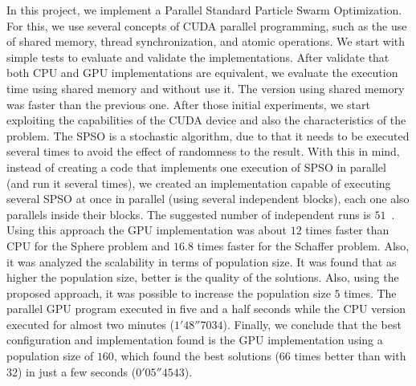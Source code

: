 \documentclass[conference]{IEEEtran}
\begin{document}
    In this project, we implement a Parallel Standard Particle Swarm Optimization.
    For this, we use several concepts of CUDA parallel programming, such as the use of shared memory, thread synchronization, and atomic operations.
    We start with simple tests to evaluate and validate the implementations.
    After validate that both CPU and GPU implementations are equivalent, we evaluate the execution time using shared memory and without use it. The version using shared memory was faster than the previous one. After those initial experiments, we start exploiting the capabilities of the CUDA device and also the characteristics of the problem. The SPSO is a stochastic algorithm, due to that it needs to be executed several times to avoid the effect of randomness to the result. With this in mind, instead of creating a code that implements one execution of SPSO in parallel (and run it several times), we created an implementation capable of executing several SPSO at once in parallel (using several independent blocks), each one also parallels inside their blocks. The suggested number of independent runs is $51$~\cite{SPSO}. Using this approach the GPU implementation was about $12$ times faster than CPU for the Sphere problem and $16.8$ times faster for the Schaffer problem.
    Also, it was analyzed the scalability in terms of population size.
    It was found that as higher the population size, better is the quality of the solutions.
    Also, using the proposed approach, it was possible to increase the population size $5$ times.
    The parallel GPU program executed in five and a half seconds while the CPU version executed for almost two minutes ($1'48''7034$). Finally, we conclude that the best configuration and implementation found is the GPU implementation using a population size of $160$, which found the best solutions ($66$ times better than with $32$) in just a few seconds ($0'05''4543$).



    
     
\end{document}
